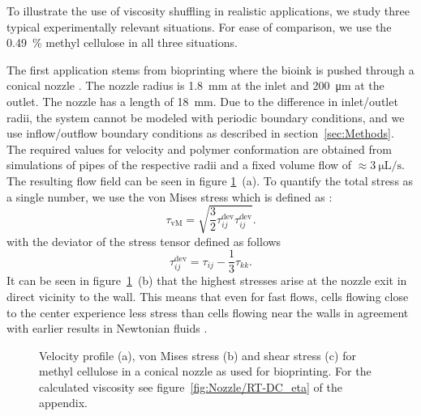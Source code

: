 \documentclass[a4paper,12pt]{scrartcl}
\begin{document}
To illustrate the use of viscosity shuffling in realistic applications, we study three typical experimentally relevant situations.
For ease of comparison, we use the \SI{0.49}{\percent} methyl cellulose in all three situations.

The first application stems from bioprinting where the bioink is pushed through a conical nozzle \cite{possl2021, Poologasundarampillai.2021, oconnell2022}.
The nozzle radius is \SI{1.8}{\milli\meter} at the inlet and \SI{200}{\micro\meter} at the outlet.
The nozzle has a length of \SI{18}{\milli\meter}.
Due to the difference in inlet/outlet radii, the system cannot be modeled with periodic boundary conditions, and we use inflow/outflow boundary conditions as described in section~\ref{sec:Methods}.
The required values for velocity and polymer conformation are obtained from simulations of pipes of the respective radii and a fixed volume flow of $\approx\SI{3}{\micro\liter\per\second}$.
The resulting flow field can be seen in figure \ref{fig:Nozzle}~(a).
To quantify the total stress as a single number, we use the von Mises stress which is defined as \cite{Mueller.2023}:
\begin{equation}
	\tau_\text{vM} = \sqrt{\frac{3}{2}\tau_{ij}^\text{dev}\tau_{ij}^\text{dev}}.
\end{equation}
with the deviator of the stress tensor defined as follows
\begin{equation}
	\tau_{ij}^\text{dev} = \tau_{ij} - \frac{1}{3}\tau_{kk}.
\end{equation}
It can be seen in figure~\ref{fig:Nozzle}~(b) that the highest stresses arise at the nozzle exit in direct vicinity to the wall.
This means that even for fast flows, cells flowing close to the center experience less stress than cells flowing near the walls in agreement with earlier results in Newtonian fluids \cite{Mueller.2023}.
	\begin{figure}[H]
		\centering
		\caption{Velocity profile (a), von Mises stress (b) and shear stress (c) for methyl cellulose in a conical nozzle as used for bioprinting. For the calculated viscosity see figure~\ref{fig:Nozzle/RT-DC_eta} of the appendix.}
		\label{fig:Nozzle}
	\end{figure}

\end{document}
